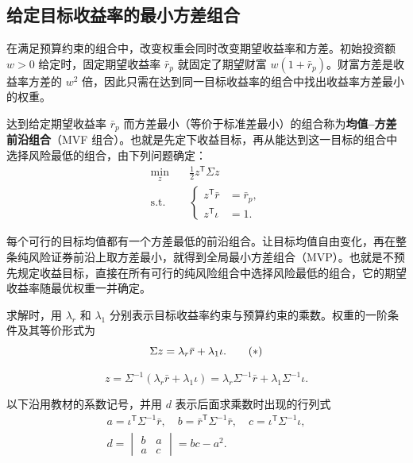 \subsection{给定目标收益率的最小方差组合}
在满足预算约束的组合中，改变权重会同时改变期望收益率和方差。初始投资额 $w>0$ 给定时，固定期望收益率 $\bar r_p$ 就固定了期望财富 $w(1+\bar r_p)$。财富方差是收益率方差的 $w^2$ 倍，因此只需在达到同一目标收益率的组合中找出收益率方差最小的权重。

\begin{tcolorbox}[knowledge]
达到给定期望收益率 $\bar r_p$ 而方差最小（等价于标准差最小）的组合称为\textbf{均值--方差前沿组合}（MVF 组合）。也就是先定下收益目标，再从能达到这一目标的组合中选择风险最低的组合，由下列问题确定：
\begin{equation}
 \begin{aligned}
 \min_z\quad &\frac12 z^{\mathsf T}\Sigma z\\
 \text{s.t.}\quad &
 \left\{\begin{aligned}
 z^{\mathsf T}\bar r&=\bar r_p,\\
 z^{\mathsf T}\iota&=1.
 \end{aligned}\right.
 \end{aligned}
 \label{eq:wj-12-2}
\end{equation}
\end{tcolorbox}

每个可行的目标均值都有一个方差最低的前沿组合。让目标均值自由变化，再在整条纯风险证券前沿上取方差最小，就得到全局最小方差组合（MVP）。也就是不预先规定收益目标，直接在所有可行的纯风险组合中选择风险最低的组合，它的期望收益率随最优权重一并确定。

求解时，用 $\lambda_r$ 和 $\lambda_1$ 分别表示目标收益率约束与预算约束的乘数。权重的一阶条件及其等价形式为
\begin{equation*}
 \Sigma z=\lambda_r\bar r+\lambda_1\iota.
 \tag{\ensuremath{*}}\label{eq:wj-12-frontier-foc}
\end{equation*}

\begin{equation*}
 z=\Sigma^{-1}(\lambda_r\bar r+\lambda_1\iota)
 =\lambda_r\Sigma^{-1}\bar r+\lambda_1\Sigma^{-1}\iota.
 \tag{12.III}\label{eq:wj-12-frontier-weights}
\end{equation*}

以下沿用教材的系数记号，并用 $d$ 表示后面求乘数时出现的行列式
\begin{equation*}
 \begin{gathered}
 a=\iota^{\mathsf T}\Sigma^{-1}\bar r,\quad
 b=\bar r^{\mathsf T}\Sigma^{-1}\bar r,\quad
 c=\iota^{\mathsf T}\Sigma^{-1}\iota,\\
 d=\begin{vmatrix}b&a\\a&c\end{vmatrix}=bc-a^2.
 \end{gathered}
 \tag{12.IV}\label{eq:wj-12-frontier-coefficients}
\end{equation*}

